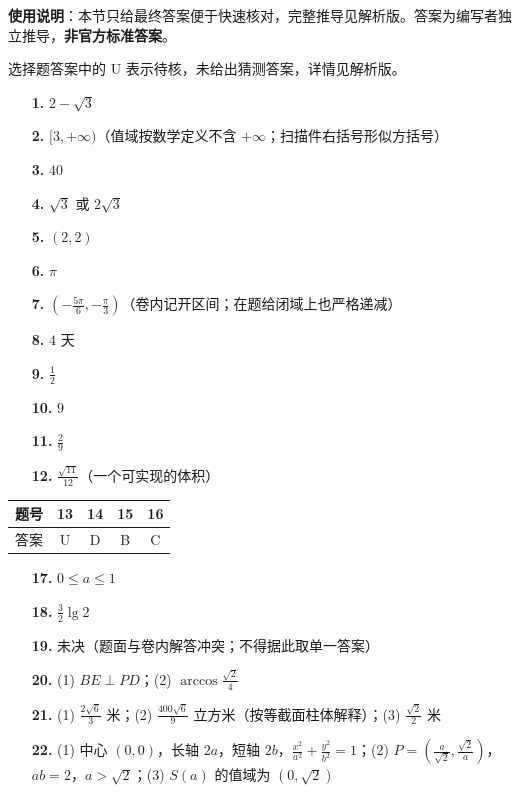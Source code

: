 
\begin{gknotice}
\textbf{使用说明}：本节只给最终答案便于快速核对，完整推导见解析版。答案为编写者独立推导，\textbf{非官方标准答案}。
\end{gknotice}

\begin{gknotice}
选择题答案中的 U 表示待核，未给出猜测答案，详情见解析版。
\end{gknotice}

\begin{itemize}[leftmargin=2.6em]
  \item[\textbf{1.}] $2-\sqrt3$
  \item[\textbf{2.}] $[3,+\infty)$（值域按数学定义不含 $+\infty$；扫描件右括号形似方括号）
  \item[\textbf{3.}] $40$
  \item[\textbf{4.}] $\sqrt3$ 或 $2\sqrt3$
  \item[\textbf{5.}] $(2,2)$
  \item[\textbf{6.}] $\pi$
  \item[\textbf{7.}] $(-\frac{5\pi}{6},-\frac\pi3)$（卷内记开区间；在题给闭域上也严格递减）
  \item[\textbf{8.}] $4$ 天
  \item[\textbf{9.}] $\frac12$
  \item[\textbf{10.}] $9$
  \item[\textbf{11.}] $\frac29$
  \item[\textbf{12.}] $\frac{\sqrt{11}}{12}$（一个可实现的体积）
\end{itemize}

\begin{center}\begin{tabular}{ccccc}
\toprule
题号 & 13 & 14 & 15 & 16 \\
\midrule
答案 & U & D & B & C \\
\bottomrule
\end{tabular}\end{center}

\begin{itemize}[leftmargin=2.6em]
  \item[\textbf{17.}] $0\le a\le1$
  \item[\textbf{18.}] $\frac32\lg2$
  \item[\textbf{19.}] 未决（题面与卷内解答冲突；不得据此取单一答案）
  \item[\textbf{20.}] (1) $BE\perp PD$；(2) $\arccos\frac{\sqrt2}{4}$
  \item[\textbf{21.}] (1) $\frac{2\sqrt6}{3}$ 米；(2) $\frac{400\sqrt6}{9}$ 立方米（按等截面柱体解释）；(3) $\frac{\sqrt2}{2}$ 米
  \item[\textbf{22.}] (1) 中心 $(0,0)$，长轴 $2a$，短轴 $2b$，$\frac{x^2}{a^2}+\frac{y^2}{b^2}=1$；(2) $P=\left(\frac a{\sqrt2},\frac{\sqrt2}{a}\right)$，$ab=2$，$a>\sqrt2$；(3) $S(a)$ 的值域为 $(0,\sqrt2)$
\end{itemize}
